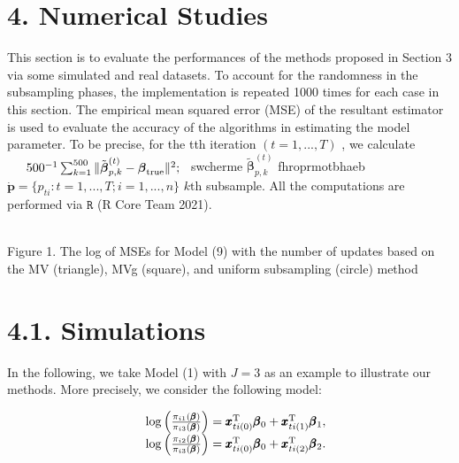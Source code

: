\section{4. Numerical Studies}\label{numerical-studies}

This section is to evaluate the performances of the methods proposed in
Section 3 via some simulated and real datasets. To account for the
randomness in the subsampling phases, the implementation is repeated
1000 times for each case in this section. The empirical mean squared
error (MSE) of the resultant estimator is used to evaluate the accuracy
of the algorithms in estimating the model parameter. To be precise, for
the tth iteration \(( t = 1 , . . . , T )\) , we calculate
\(\begin{array} { r l } { } & { { } 5 0 0 ^ { - 1 } \sum _ { k = 1 } ^ { 5 0 0 } \| \tilde { \boldsymbol { \beta } } _ { p , k } ^ { ( t ) } - \boldsymbol { \beta } _ { \mathrm { t r u e } } \| ^ { 2 } ; } \end{array}\)
swcherme \(\tilde { \pmb { \beta } } _ { p , k } ^ { ( t ) }\)
fhroprmotbhaeb
\(\pmb { \dot { p } } = \{ p _ { t i } : t = 1 , . . . , T ; i = 1 , . . . , n \}\)
\(k { \mathrm { t h } }\) subsample. All the computations are performed
via \(\mathtt { R }\) (R Core Team 2021).

\\
Figure 1. The log of MSEs for Model (9) with the number of updates based
on the MV (triangle), MVg (square), and uniform subsampling (circle)
method

\section{4.1. Simulations}\label{simulations}

In the following, we take Model (1) with \(J = 3\) as an example to
illustrate our methods. More precisely, we consider the following model:

\[
\begin{array} { r l } & { \log \left( \frac { \pi _ { i 1 } ( \pmb { \beta } ) } { \pi _ { i 3 } ( \pmb { \beta } ) } \right) = \pmb { x } _ { t i ( 0 ) } ^ { \mathrm { { T } } } \pmb { \beta } _ { 0 } + \pmb { x } _ { t i ( 1 ) } ^ { \mathrm { { T } } } \pmb { \beta } _ { 1 } , } \\ & { \log \left( \frac { \pi _ { i 2 } ( \pmb { \beta } ) } { \pi _ { i 3 } ( \pmb { \beta } ) } \right) = \pmb { x } _ { t i ( 0 ) } ^ { \mathrm { { T } } } \pmb { \beta } _ { 0 } + \pmb { x } _ { t i ( 2 ) } ^ { \mathrm { { T } } } \pmb { \beta } _ { 2 } . } \end{array}
\]

